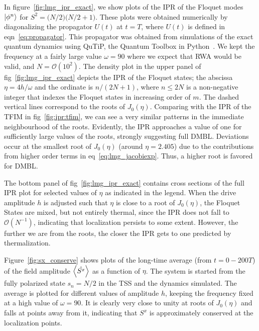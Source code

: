 \documentclass[%
reprint,
superscriptaddress,
linenumbers,
amsmath,amssymb,
aps,
prb,
showkeys,
]{revtex4-2}
\begin{document}
		In figure~\ref{fig:lmg_ipr_exact}, we show plots of the IPR of the Floquet modes $\ket{\phi^n}$ for $S^2 = \big(N/2\big)\big(N/2 + 1\big)$.
	 These plots were obtained numerically by diagonalizing the propagator $U(t)$ at $t=T$, where $U(t)$ is defined in eqn~\ref{eq:propagator}. This propagator was obtained from simulations of the exact quantum dynamics using QuTiP, the Quantum Toolbox in Python~\cite{qutip}. We kept the frequency at a fairly large value $\omega = 90$ where we expect that RWA would be valid, and $N=\mathcal{O}(10^2)$. The density plot in the upper panel of fig~\ref{fig:lmg_ipr_exact} depicts the IPR of the Floquet states; the abscissa  $\eta=4h/\omega$ and the ordinate is $n/(2N+1)$, where $n\leq 2N$ is a non-negative integer that indexes the Floquet states in increasing order of $m$. The dashed vertical lines correspond to the roots of $J_0(\eta)$. Comparing with the IPR of the TFIM in fig~\ref{fig:ipr:tfim}, we can see a very similar patterns in the immediate neighbourhood of the roots. Evidently, the IPR approaches a value of one for sufficiently large values of the roots, strongly suggesting full DMBL. Deviations occur at the smallest root of $J_0(\eta)$ (around $\eta = 2.405$) due to the contributions from higher order terms in eq~\ref{eq:lmg_jacobiexp}. Thus, a higher root is favored for DMBL.
	
	The bottom panel of fig~\ref{fig:lmg_ipr_exact} contains cross sections of the full IPR plot for selected values of $\eta$ as indicated in the legend. When the drive amplitude $h$ is adjusted such that $\eta$ is close to a root of $J_0(\eta)$, the Floquet States are mixed, but not entirely thermal, since the IPR does not fall to $\mathcal{O}(N^{-1})$, indicating that localization persists to some extent. However, the further we are from the roots, the closer the IPR gets to one predicted by thermalization.
	
	Figure~\ref{fig:sx_conserve} shows plots of the long-time average (from $t=0-200T$) of the field amplitude $\expval{\hat{S^x}}$ as a function of $\eta$. The system is started from the fully polarized state $s_n=N/2$ in the TSS and the dynamics simulated. The average is plotted for different values of amplitude $h$, keeping the frequency fixed at a high value of $\omega=90$. It is clearly very close to unity at roots of $J_0(\eta)$ and falls at points away from it, indicating that $S^x$ is approximately conserved at the localization points.
	
\end{document}
